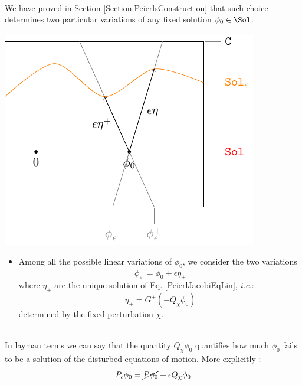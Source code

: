 \documentclass[Main]{subfiles}
\begin{document}
		\vspace{1mm}
		\\
		We have proved in Section \ref{Section:PeierlsConstruction} that such choice determines two particular variations of any fixed solution $\phi_0 \in \Sol$.

		\vspace{1mm}		
		\begin{minipage}{0.5\textwidth}
			\includegraphics[width=\textwidth]{Pictures/GeometricPicture2}
		\end{minipage}
		\begin{minipage}{0.5\textwidth}
			\begin{itemize}
				\item	Among all the possible linear variations of $\phi_0$, we consider the two variations $$\phi_\epsilon^\pm = \phi_0 + \epsilon \eta_\pm$$ where $\eta_\pm$ are the unique solution of Eq. \ref{PeierlJacobiEqLin}, \textit{i.e.}:
					\begin{displaymath}
   						\eta_\pm = G^\pm \left( - Q_\chi \phi_0 \right)
					\end{displaymath}
					determined by the fixed perturbation $\chi$.
			\end{itemize}
		\end{minipage}
		\vspace{1mm}\\		
	
		In layman terms we can say that the quantity $Q_\chi \phi_0$ quantifies how much $\phi_0$ fails to be a solution of the disturbed equations of motion.
		More explicitly :
		\begin{displaymath}
			P_\epsilon \phi_0 =  \cancel{P \phi_0} + \epsilon Q_\chi \phi_0
		\end{displaymath}
		
\end{document}
